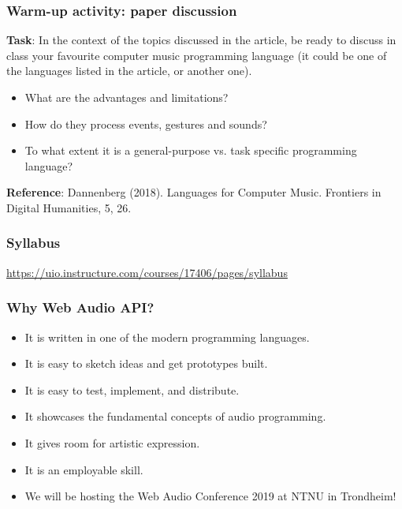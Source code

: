 \documentclass[screen, aspectratio=43]{beamer}
\begin{document}
\begin{frame}
\frametitle{Warm-up activity: paper discussion}
\textbf{Task}: In the context of the topics discussed in the article, be ready to discuss in class your favourite computer music programming language (it could be one of the languages listed in the article, or another one). 
\begin{itemize}
\item What are the advantages and limitations?
\item How do they process events, gestures and sounds?
\item To what extent it is a general-purpose vs. task specific programming language?
\end{itemize}
\hfill \break
\textbf{Reference}: Dannenberg (2018). Languages for Computer Music. Frontiers in Digital Humanities, 5, 26.\\
\end{frame}
%
\begin{frame}
\frametitle{Syllabus}
\url{https://uio.instructure.com/courses/17406/pages/syllabus}
\end{frame}
%
\begin{frame}
\frametitle{Why Web Audio API?}
\begin{itemize}
\item It is written in one of the modern programming languages.
\item It is easy to sketch ideas and get prototypes built.
\item It is easy to test, implement, and distribute.
\item It showcases the fundamental concepts of audio programming.
\item It gives room for artistic expression.
\item It is an employable skill.
\item We will be hosting the Web Audio Conference 2019 at NTNU in Trondheim!
\end{itemize}
\end{frame}
%
\end{document}
